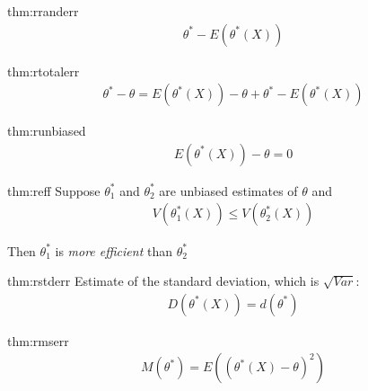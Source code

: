 \begin{theo}{thm:rranderr}
  \begin{equation*}
    \begin{gathered}
      \theta^*-E(\theta^*(X))
    \end{gathered}
  \end{equation*}
\end{theo}
\par\bigskip
\begin{theo}{thm:rtotalerr}
  \begin{equation*}
    \begin{gathered}
      \theta^*-\theta = E(\theta^*(X))-\theta + \theta^*-E(\theta^*(X))
    \end{gathered}
  \end{equation*}
\end{theo}
\par\bigskip
\begin{theo}{thm:runbiased}
  \begin{equation*}
    \begin{gathered}
      E(\theta^*(X))-\theta = 0
    \end{gathered}
  \end{equation*}
\end{theo}
\newpage
\begin{theo}[Efficiency]{thm:reff}
  Suppose $\theta_1^*$ and $\theta_2^*$ are unbiased estimates of $\theta$ and
  \begin{equation*}
    \begin{gathered}
      V(\theta_1^*(X))\leq V(\theta_2^*(X))
    \end{gathered}
  \end{equation*}
  \par\bigskip
  \noindent Then $\theta_1^*$ is \textit{more efficient} than $\theta_2^*$
\end{theo}
\par\bigskip
\begin{theo}{thm:rstderr}
  Estimate of the standard deviation, which is $\sqrt{Var}$:
  \begin{equation*}
    \begin{gathered}
      D(\theta^*(X)) = d(\theta^*)
    \end{gathered}
  \end{equation*}
\end{theo}
\par\bigskip
  \begin{theo}{thm:rmserr}
    \begin{equation*}
      \begin{gathered}
        M(\theta^*) = E((\theta^*(X)-\theta)^2)
      \end{gathered}
    \end{equation*}
  \end{theo}
